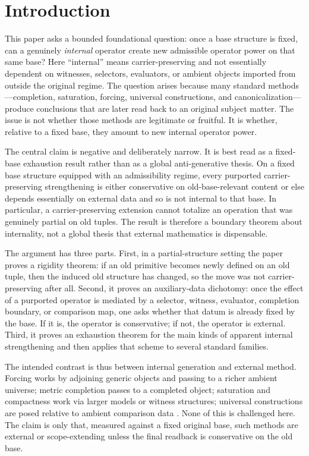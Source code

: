 \section{Introduction}\label{sec:introduction}

This paper asks a bounded foundational question: once a base structure is fixed, can a genuinely \emph{internal} operator create new admissible operator power on that same base? Here ``internal'' means carrier-preserving and not essentially dependent on witnesses, selectors, evaluators, or ambient objects imported from outside the original regime. The question arises because many standard methods---completion, saturation, forcing, universal constructions, and canonicalization---produce conclusions that are later read back to an original subject matter. The issue is not whether those methods are legitimate or fruitful. It is whether, relative to a fixed base, they amount to new internal operator power.

The central claim is negative and deliberately narrow. It is best read as a fixed-base exhaustion result rather than as a global anti-generative thesis. On a fixed base structure equipped with an admissibility regime, every purported carrier-preserving strengthening is either conservative on old-base-relevant content or else depends essentially on external data and so is not internal to that base. In particular, a carrier-preserving extension cannot totalize an operation that was genuinely partial on old tuples. The result is therefore a boundary theorem about internality, not a global thesis that external mathematics is dispensable.

The argument has three parts. First, in a partial-structure setting the paper proves a rigidity theorem: if an old primitive becomes newly defined on an old tuple, then the induced old structure has changed, so the move was not carrier-preserving after all. Second, it proves an auxiliary-data dichotomy: once the effect of a purported operator is mediated by a selector, witness, evaluator, completion boundary, or comparison map, one asks whether that datum is already fixed by the base. If it is, the operator is conservative; if not, the operator is external. Third, it proves an exhaustion theorem for the main kinds of apparent internal strengthening and then applies that scheme to several standard families.

The intended contrast is thus between internal generation and external method. Forcing works by adjoining generic objects and passing to a richer ambient universe; metric completion passes to a completed object; saturation and compactness work via larger models or witness structures; universal constructions are posed relative to ambient comparison data \citep{Hodges1993,Marker2002,Jech2003,Kanamori2008,MacLane1998}. None of this is challenged here. The claim is only that, measured against a fixed original base, such methods are external or scope-extending unless the final readback is conservative on the old base.

